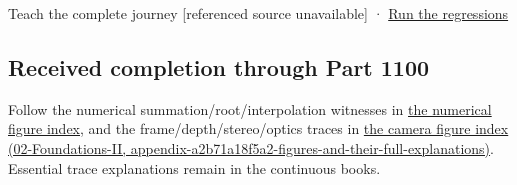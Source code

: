 {Teach the complete journey {[}referenced source unavailable{]}} · \hyperref[appendix-4e2236f53445-representation-codecs-and-bounded-file-laboratory]{Run the regressions}

\subsection{Received completion through Part 1100}\label{appendix-92ff77d4dfdc-received-completion-through-part-1100}

Follow the numerical summation/root/interpolation witnesses in \hyperref[appendix-cb5af353ef77-numerical-reliability-figures-and-their-explanations]{the numerical figure index}, and the frame/depth/stereo/optics traces in \href{../02-Foundations-II/main.pdf\#nameddest=appendix-a2b71a18f5a2-figures-and-their-full-explanations}{the camera figure index (02-Foundations-II, appendix-a2b71a18f5a2-figures-and-their-full-explanations)}. Essential trace explanations remain in the continuous books.
